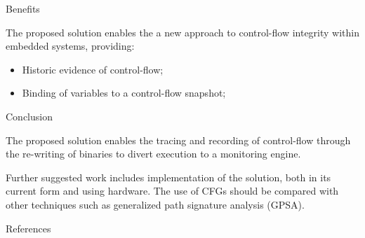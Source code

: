 \documentclass[final]{beamer}
\newlength{\onecolwid}
\begin{document}
\begin{frame}[t]
\begin{columns}[t]
\begin{column}{\onecolwid}
\begin{alertblock}{Benefits}

The proposed solution enables the a new approach to control-flow integrity within embedded systems, providing:
\begin{itemize}
\item Historic evidence of control-flow;
\item Binding of variables to a control-flow snapshot;
\end{itemize}

\end{alertblock}

\vspace*{1cm}
\begin{block}{Conclusion}

The proposed solution enables the tracing and recording of control-flow through the re-writing of binaries to divert execution to a monitoring engine.

Further suggested work includes implementation of the solution, both in its current form and using hardware. The use of CFGs should be compared with other techniques such as generalized path signature analysis (GPSA).

\end{block}

\vspace*{1cm}
\begin{block}{References}

\nocite{*} %
\footnotesize{
}

\end{block}




\end{column}
\end{columns}
\end{frame}
\end{document}
